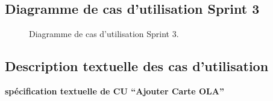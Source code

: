 \documentclass[a4paper,11pt]{report}
\begin{document}
\subsection{Diagramme de cas d’utilisation Sprint 3}
\begin{figure}[H]
  \centering
  \setlength{\fboxrule}{1pt}
  \setlength{\fboxsep}{3pt}
  \caption{Diagramme de cas d’utilisation Sprint 3.}
  \label{fig:clone-result}
\end{figure}
\subsection{Description textuelle des cas d'utilisation}

\textbf{spécification textuelle de CU “Ajouter Carte OLA”}
\end{document}
